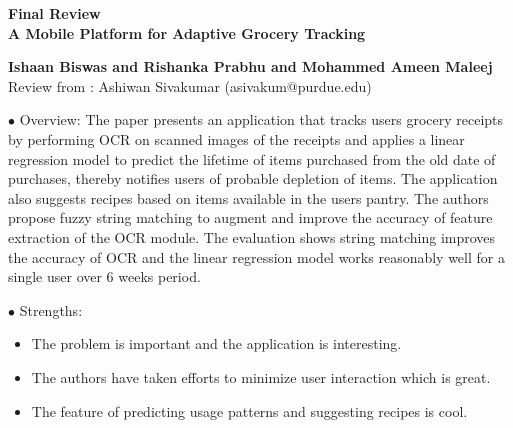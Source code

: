 \documentclass[a4paper, 12pt]{article}
\begin{document}
\thispagestyle{fancy}
\lhead{}
\rhead{}
\renewcommand{\headrulewidth}{0pt} 
\renewcommand{\footrulewidth}{0pt} 
\rhead{\textcolor{gray}{\thepage/\totalpages{}}}
\begin{center}
{\LARGE \bf Final Review}\\
\vspace*{0.1cm}
{\LARGE \bf A Mobile Platform for Adaptive Grocery Tracking}\\
\vspace*{0.1cm}

{\bf Ishaan Biswas and Rishanka Prabhu and Mohammed Ameen Maleej}\\

\vspace*{0.1cm}
{\normalsize Review from : Ashiwan Sivakumar (asivakum@purdue.edu)}

\noindent$\bullet$ Overview:
The paper presents an application that tracks users grocery receipts by performing OCR on scanned
images of the receipts and applies a linear regression model to predict the lifetime of items purchased
from the old date of purchases, thereby notifies users of probable depletion of items. The application also
suggests recipes based on items available in the users pantry. The authors propose fuzzy string matching to augment
and improve the accuracy of feature extraction of the OCR module. The evaluation shows string matching improves the accuracy
of OCR and the linear regression model works reasonably well for a single user over 6 weeks period. 

\noindent$\bullet$ Strengths:
\begin{itemize}
\item The problem is important and the application is interesting.
\item The authors have taken efforts to minimize user interaction which is great. 
\item The feature of predicting usage patterns and suggesting recipes is cool.
\end{itemize}


\end{center}
\end{document}
